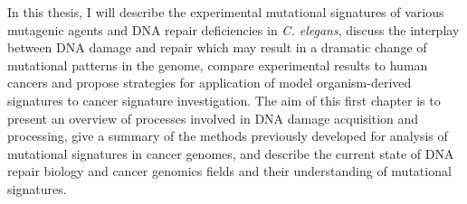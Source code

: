 In this thesis, I will describe the experimental mutational signatures of various mutagenic 
agents and DNA repair deficiencies in \textit{C. elegans}, discuss the interplay between 
DNA damage and repair which may result in a dramatic change of mutational patterns in the 
genome, compare experimental results to human cancers and propose strategies for application 
of model organism-derived signatures to cancer signature investigation. The aim of 
this first chapter is to present an overview of processes involved in DNA damage acquisition 
and processing, give a summary of the methods previously developed for analysis of mutational 
signatures in cancer genomes, and describe the current state of DNA repair biology and cancer 
genomics fields and their understanding of mutational signatures.




